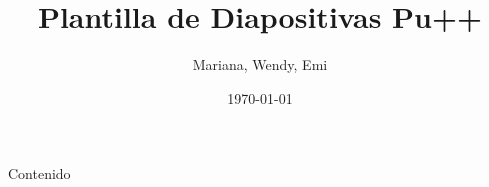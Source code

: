 \documentclass[aspectratio=169]{beamer} %
\title{Plantilla de Diapositivas Pu++}
\author{Mariana, Wendy, Emi}
\date{\today}
\begin{document}
\portadapumasmas
\usebackgroundtemplate{}

\begin{frame}{Contenido}
    \tableofcontents
\end{frame}



\end{document}
